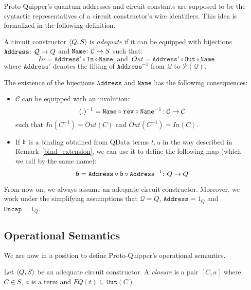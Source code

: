 \documentclass{article}
\begin{document}
Proto-Quipper's quantum addresses and circuit constants are supposed 
to be the syntactic representatives of a circuit constructor's wire 
identifiers. This idea is formalized in the following definition.

\begin{definition}
A circuit constructor $\langle Q,S\rangle$ is \emph{adequate} if it can 
be equipped with bijections $\mathtt{Address}\colon \mathcal{Q} \to Q$ 
and $\mathtt{Name}\colon \mathcal{C} \to S$ such that:
\[In=\mathtt{Address}' \circ\mathtt{In}\circ \mathtt{Name} 
~\mbox{ and }~ 
Out=\mathtt{Address}'\circ\mathtt{Out}\circ \mathtt{Name}
\]
where $\mathtt{Address}'$ denotes the lifting of $\mathtt{Address}^{-1}$ 
from $\mathcal{Q}$ to $\mathcal{P}(\mathcal{Q})$.
\end{definition}

\begin{remark}
\label{structure-transfer}
The existence of the bijections $\mathtt{Address}$ and $\mathtt{Name}$ has 
the following consequences:
\begin{itemize}
  \item $\mathcal{C}$ can be equipped with an involution:
\[
(.)^{-1} = \mathtt{Name}\circ \mathtt{rev} \circ \mathtt{Name}^{-1}
           \colon \mathcal{C}\to\mathcal{C}
\]
such that $In(C^{-1})=Out(C)$ and 
$Out(C^{-1})=In(C)$.
  \item If $\mathfrak{b}$ is a binding obtained from QData terms $t,u$ in the 
  way described in Remark~\hyperref[bind_extension]{\ref*{bind_extension}}, 
  we can use it to define the following map (which we call by the same name):
  \[
  \mathfrak{b} = \mathtt{Address}\circ \mathfrak{b}\circ \mathtt{Address}^{-1}\colon Q\to Q
  \]
\end{itemize}

From now on, we always assume an adequate circuit constructor. Moreover, we work 
under the simplifying assumptions that $\mathcal{Q}=Q$, $\mathtt{Address}=1_Q$ 
and $\mathtt{Encap}=1_Q$.
\end{remark}


\subsection{Operational Semantics}

We are now in a position to define Proto-Quipper's operational 
semantics.

\begin{definition}
Let $\langle Q,S\rangle$ be an adequate circuit constructor. A 
\emph{closure} is a pair $[C,a]$ where $C\in S$, $a$ is a 
term and $FQ(t)\subseteq\mathtt{Out}(C)$. 
\end{definition}
\end{document}
